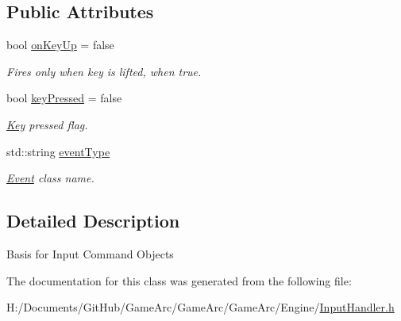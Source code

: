\subsection*{Public Attributes}
\begin{DoxyCompactItemize}
\item 
\hypertarget{class_input_command_a099c658ec29f0ec0cd3c30535c76b4a9}{bool \hyperlink{class_input_command_a099c658ec29f0ec0cd3c30535c76b4a9}{on\+Key\+Up} = false}\label{class_input_command_a099c658ec29f0ec0cd3c30535c76b4a9}

\begin{DoxyCompactList}\small\item\em Fires only when key is lifted, when true. \end{DoxyCompactList}\item 
\hypertarget{class_input_command_a64175f320e19197d623586f24a0cf2c1}{bool \hyperlink{class_input_command_a64175f320e19197d623586f24a0cf2c1}{key\+Pressed} = false}\label{class_input_command_a64175f320e19197d623586f24a0cf2c1}

\begin{DoxyCompactList}\small\item\em \hyperlink{class_key}{Key} pressed flag. \end{DoxyCompactList}\item 
\hypertarget{class_input_command_a0b2bfae63bec459ea0df48dc0fc8ec36}{std\+::string \hyperlink{class_input_command_a0b2bfae63bec459ea0df48dc0fc8ec36}{event\+Type}}\label{class_input_command_a0b2bfae63bec459ea0df48dc0fc8ec36}

\begin{DoxyCompactList}\small\item\em \hyperlink{class_event}{Event} class name. \end{DoxyCompactList}\end{DoxyCompactItemize}


\subsection{Detailed Description}
Basis for Input Command Objects 

The documentation for this class was generated from the following file\+:\begin{DoxyCompactItemize}
\item 
H\+:/\+Documents/\+Git\+Hub/\+Game\+Arc/\+Game\+Arc/\+Game\+Arc/\+Engine/\hyperlink{_input_handler_8h}{Input\+Handler.\+h}\end{DoxyCompactItemize}
